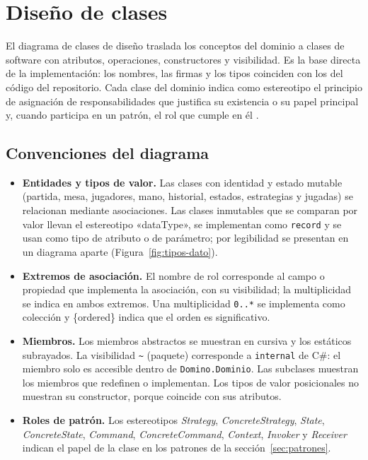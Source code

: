 \section{Diseño de clases}\label{sec:clases}

El diagrama de clases de diseño traslada los conceptos del dominio a clases de software con atributos, operaciones, constructores y visibilidad. Es la base directa de la implementación: los nombres, las firmas y los tipos coinciden con los del código del repositorio. Cada clase del dominio indica como estereotipo el principio de asignación de responsabilidades que justifica su existencia o su papel principal  y, cuando participa en un patrón, el rol que cumple en él .

\subsection{Convenciones del diagrama}

\begin{itemize}
  \item \textbf{Entidades y tipos de valor.} Las clases con identidad y estado mutable (partida, mesa, jugadores, mano, historial, estados, estrategias y jugadas) se relacionan mediante asociaciones. Las clases inmutables que se comparan por valor llevan el estereotipo «dataType», se implementan como \texttt{record} y se usan como tipo de atributo o de parámetro; por legibilidad se presentan en un diagrama aparte (Figura~\ref{fig:tipos-dato}).
  \item \textbf{Extremos de asociación.} El nombre de rol corresponde al campo o propiedad que implementa la asociación, con su visibilidad; la multiplicidad se indica en ambos extremos. Una multiplicidad \texttt{0..*} se implementa como colección y \{ordered\} indica que el orden es significativo.
  \item \textbf{Miembros.} Los miembros abstractos se muestran en cursiva y los estáticos subrayados. La visibilidad \texttt{\textasciitilde} (paquete) corresponde a \texttt{internal} de C\#: el miembro solo es accesible dentro de \texttt{Domino.Dominio}. Las subclases muestran los miembros que redefinen o implementan. Los tipos de valor posicionales no muestran su constructor, porque coincide con sus atributos.
  \item \textbf{Roles de patrón.} Los estereotipos \emph{Strategy}, \emph{ConcreteStrategy}, \emph{State}, \emph{ConcreteState}, \emph{Command}, \emph{ConcreteCommand}, \emph{Context}, \emph{Invoker} y \emph{Receiver} indican el papel de la clase en los patrones de la sección~\ref{sec:patrones}.
\end{itemize}

